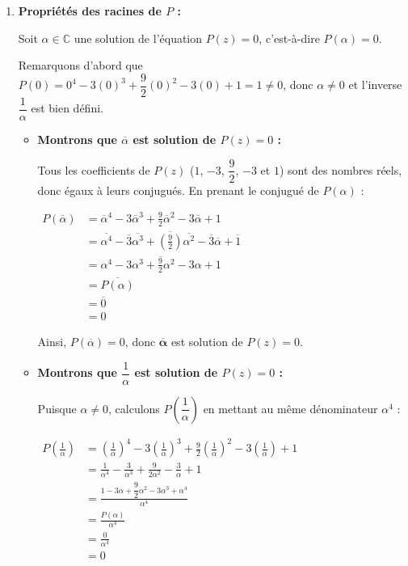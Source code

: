 \documentclass[12pt,a4paper]{article}
\begin{document}
\begin{enumerate}
    \item \textbf{Propriétés des racines de $P$ :}
    
    Soit $\alpha \in \mathbb{C}$ une solution de l'équation $P(z) = 0$, c'est-à-dire $P(\alpha) = 0$.
    
    Remarquons d'abord que $P(0) = 0^4 - 3(0)^3 + \dfrac{9}{2}(0)^2 - 3(0) + 1 = 1 \neq 0$, donc $\alpha \neq 0$ et l'inverse $\dfrac{1}{\alpha}$ est bien défini.

    \begin{itemize}
        \item \textbf{Montrons que $\overline{\alpha}$ est solution de $P(z) = 0$ :}
        
        Tous les coefficients de $P(z)$ ($1$, $-3$, $\dfrac{9}{2}$, $-3$ et $1$) sont des nombres réels, donc égaux à leurs conjugués. En prenant le conjugué de $P(\alpha)$ :
        
        $
        \begin{aligned}
            P(\overline{\alpha}) &= \overline{\alpha}^4 - 3\overline{\alpha}^3 + \frac{9}{2}\overline{\alpha}^2 - 3\overline{\alpha} + 1\\
            &= \overline{\alpha^4} - \overline{3}\overline{\alpha^3} + \overline{\left(\frac{9}{2}\right)}\overline{\alpha^2} - \overline{3}\overline{\alpha} + \overline{1}\\
            &= \overline{\alpha^4 - 3\alpha^3 + \frac{9}{2}\alpha^2 - 3\alpha + 1}\\
            &= \overline{P(\alpha)}\\
            &= \overline{0}\\
            &= 0
        \end{aligned}
        $
        
        Ainsi, $P(\overline{\alpha}) = 0$, donc $\mathbf{\overline{\alpha}}$ est solution de $P(z) = 0$.

        \item \textbf{Montrons que $\dfrac{1}{\alpha}$ est solution de $P(z) = 0$ :}
        
        Puisque $\alpha \neq 0$, calculons $P\left(\dfrac{1}{\alpha}\right)$ en mettant au même dénominateur $\alpha^4$ :
        
        $
        \begin{aligned}
            P\left(\frac{1}{\alpha}\right) &= \left(\frac{1}{\alpha}\right)^4 - 3\left(\frac{1}{\alpha}\right)^3 + \frac{9}{2}\left(\frac{1}{\alpha}\right)^2 - 3\left(\frac{1}{\alpha}\right) + 1\\
            &= \frac{1}{\alpha^4} - \frac{3}{\alpha^3} + \frac{9}{2\alpha^2} - \frac{3}{\alpha} + 1\\
            &= \frac{1 - 3\alpha + \dfrac{9}{2}\alpha^2 - 3\alpha^3 + \alpha^4}{\alpha^4}\\
            &= \frac{P(\alpha)}{\alpha^4}\\
            &= \frac{0}{\alpha^4}\\
            &= 0
        \end{aligned}
        $
        

\end{itemize}
\end{enumerate}
\end{document}
